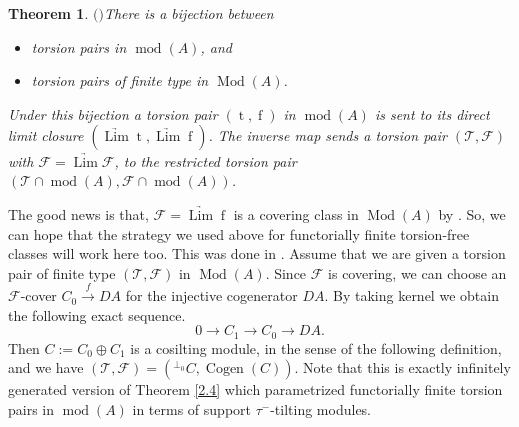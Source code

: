 \documentclass[12pt]{amsart}
\numberwithin{equation}{section}
\newtheorem{theorem}[lemma]{Theorem}
\theoremstyle{definition}
\DeclareMathOperator{\Mod}{Mod}
\DeclareMathOperator{\modd}{mod}
\DeclareMathOperator{\Lim}{Lim}
\DeclareMathOperator{\Cogen}{Cogen}
\DeclareMathOperator{\ts}{t}
\DeclareMathOperator{\fs}{f}
\newtheorem*{theorem 0*}{Theorem}
\newtheorem*{theorem a*}{Theorem A}
\newtheorem*{theorem b*}{Theorem B}
\numberwithin{diagram}{section}
\begin{document}
\begin{theorem} $($\cite{CB}$)$\label{2.5}
There is a bijection between
\begin{itemize}
	\item[(1)]
    torsion pairs in $\modd(A)$, and
	\item[(2)]
    torsion pairs of finite type in $\Mod(A)$.
	\end{itemize}
Under this bijection a torsion pair $(\ts,\fs)$ in $\modd(A)$ is sent to its direct limit closure $(\underrightarrow{\Lim}\ts,\underrightarrow{\Lim}\fs)$.
The inverse map sends a torsion pair $(\mathcal{T},\mathcal{F})$ with $\mathcal{F}=\underrightarrow{\Lim}\mathcal{F}$, to the restricted torsion pair $(\mathcal{T}\cap \modd(A),\mathcal{F}\cap \modd(A))$.
\end{theorem}
	
The good news is that, $\mathcal{F}=\underrightarrow{\Lim}\fs$ is a covering class in $\Mod(A)$ by \cite{El}. So, we can hope that the strategy we used above for functorially finite torsion-free classes will work here too. This was done in \cite{ZW}.
Assume that we are given a torsion pair of finite type $(\mathcal{T},\mathcal{F})$ in $\Mod(A)$. Since $\mathcal{F}$ is covering, we can choose an $\mathcal{F}$-cover $C_0\overset{f}{\rightarrow} DA$ for the injective cogenerator $DA$. By taking kernel we obtain the following exact sequence.
\[0\rightarrow C_1\rightarrow C_0\rightarrow DA.\]
Then $C:=C_0\oplus C_1$ is a cosilting module, in the sense of the following definition, and we have $(\mathcal{T},\mathcal{F})=({}^{\bot_0}C,\Cogen(C))$. Note that this is exactly infinitely generated version of Theorem \ref{2.4} which parametrized functorially finite torsion pairs in $\modd(A)$ in terms of support $\tau^-$-tilting modules.
\end{document}
